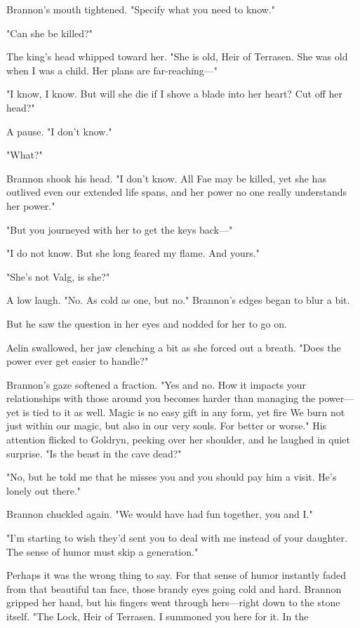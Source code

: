 Brannon's mouth tightened. "Specify what you need to know."

"Can she be killed?"

The king's head whipped toward her. "She is old, Heir of Terrasen. She was old when I was a child. Her plans are far-reaching---"

"I know, I know. But will she die if I shove a blade into her heart? Cut off her head?"

A pause. "I don't know."

"What?"

Brannon shook his head. "I don't know. All Fae may be killed, yet she has outlived even our extended life spans, and her power  no one really understands her power."

"But you journeyed with her to get the keys back---"

"I do not know. But she long feared my flame. And yours."

"She's not Valg, is she?"

A low laugh. "No. As cold as one, but no." Brannon's edges began to blur a bit.

But he saw the question in her eyes and nodded for her to go on.

Aelin swallowed, her jaw clenching a bit as she forced out a breath. "Does the power ever get easier to handle?"

Brannon's gaze softened a fraction. "Yes and no. How it impacts your relationships with those around you becomes harder than managing the power--- yet is tied to it as well. Magic is no easy gift in any form, yet fire  We burn not just within our magic, but also in our very souls. For better or worse." His attention flicked to Goldryn, peeking over her shoulder, and he laughed in quiet surprise. "Is the beast in the cave dead?"

"No, but he told me that he misses you and you should pay him a visit. He's lonely out there."

Brannon chuckled again. "We would have had fun together, you and I."

"I'm starting to wish they'd sent you to deal with me instead of your daughter. The sense of humor must skip a generation."

Perhaps it was the wrong thing to say. For that sense of humor instantly faded from that beautiful tan face, those brandy eyes going cold and hard. Brannon gripped her hand, but his fingers went through hers---right down to the stone itself. "The Lock, Heir of Terrasen. I summoned you here for it. In the

